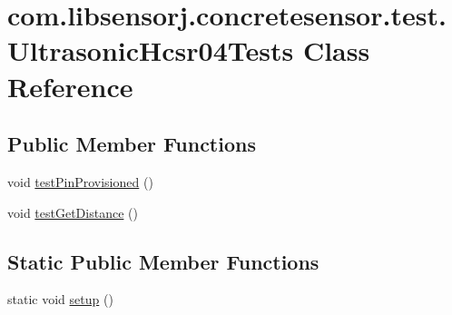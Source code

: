 \hypertarget{classcom_1_1libsensorj_1_1concretesensor_1_1test_1_1UltrasonicHcsr04Tests}{}\section{com.\+libsensorj.\+concretesensor.\+test.\+Ultrasonic\+Hcsr04\+Tests Class Reference}
\label{classcom_1_1libsensorj_1_1concretesensor_1_1test_1_1UltrasonicHcsr04Tests}
\subsection*{Public Member Functions}
\begin{DoxyCompactItemize}
\item 
void \hyperlink{classcom_1_1libsensorj_1_1concretesensor_1_1test_1_1UltrasonicHcsr04Tests_aec86328eb21c3c5394606bbf52cdb507}{test\+Pin\+Provisioned} ()
\item 
void \hyperlink{classcom_1_1libsensorj_1_1concretesensor_1_1test_1_1UltrasonicHcsr04Tests_afe97e7486972bdd52f7dd3d652566db7}{test\+Get\+Distance} ()
\end{DoxyCompactItemize}
\subsection*{Static Public Member Functions}
\begin{DoxyCompactItemize}
\item 
static void \hyperlink{classcom_1_1libsensorj_1_1concretesensor_1_1test_1_1UltrasonicHcsr04Tests_afbf1cd39d83e2df5d01b4cbe546269f6}{setup} ()
\end{DoxyCompactItemize}

